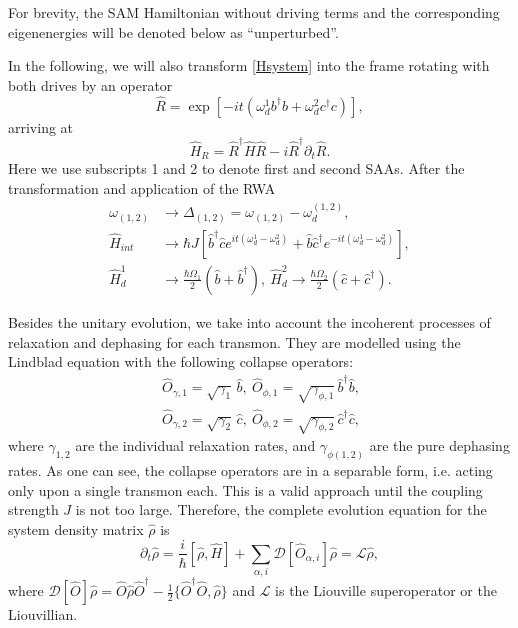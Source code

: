 \documentclass[%
 prx,
 amsmath,amssymb,
 reprint,%
]{revtex4-1}
\begin{document}
For brevity, the SAM Hamiltonian without driving terms and the corresponding eigenenergies will be denoted below as ``unperturbed''.

In the following, we will also transform \autoref{Hsystem} into the frame rotating with both drives by an operator
\begin{equation}
\hat R = \exp[-i t (\omega_d^1 b^{\dagger}b+\omega_d^2 c^{\dagger}c)],\label{eq:R}
\end{equation}
arriving at
\begin{equation}
\hat H_R = \hat R^{\dagger}\hat H \hat R -	 {i}\hat R^{\dagger}\partial_t \hat R.\label{eq:rotation}
\end{equation}
Here we use subscripts 1 and 2 to denote first and second SAAs. After the transformation and application of the RWA
\begin{equation}
\begin{aligned}
	\omega_{(1,2)} &\rightarrow \Delta_{(1,2)} = \omega_{(1,2)} - \omega_d^{(1,2)},\\
	\hat H_{int} &\rightarrow \hbar J \left[\hat b^\dag \hat c e^{it(\omega_d^1 - \omega_d^2)} + \hat b \hat c^\dag e^{-it(\omega_d^1 - \omega_d^2)}\right],\\
	\hat H_{d}^1 &\rightarrow \frac{\hbar \Omega_1}{2}(\hat b  + \hat b^\dag),\ 	\hat H_{d}^2 \rightarrow \frac{\hbar \Omega_2}{2}(\hat c  + \hat c^\dag).
\end{aligned}
\label{eq:RWA}
\end{equation}

Besides the unitary evolution, we take into account the incoherent processes of relaxation and dephasing for each transmon. They are modelled using the Lindblad equation with the following collapse operators\cite{bishop2010circuit}:
\begin{equation}\
\begin{split}
\hat{{O}}_{\gamma, 1} = \sqrt{\gamma_1}\, \hat b,\ 
\hat{{O}}_{\phi, 1} = \sqrt{\gamma_{\phi,1}}\, \hat b^\dag \hat b,\\
\hat{{O}}_{\gamma,2} = \sqrt{\gamma_2}\, \hat c,\ 
\hat{{O}}_{\phi,2} = \sqrt{\gamma_{ \phi,2}}\, \hat c^\dag \hat c,
\end{split}
\end{equation}
where $\gamma_{1,2}$ are the individual relaxation rates, and $\gamma_{\phi (1,2)}$ are the pure dephasing rates. As one can see, the collapse operators are in a separable form, i.e. acting only upon a single transmon each. This is a valid approach until the coupling strength $J$ is not too large\cite{beaudoin2011dissipation}. Therefore, the complete evolution equation for the system density matrix $\hat \rho$ is
\begin{equation}
\partial_t \hat \rho = \frac{i}{\hbar}[\hat \rho, \hat H] + \sum_{\alpha, i} \mathcal{D}[\hat{O}_{\alpha, i}] \hat \rho = \mathcal{L}\hat\rho, \label{eq:master}
\end{equation}
where $\mathcal{D}[\hat{{O}}]\hat \rho = \hat{{O}} \hat \rho \hat{{O}}^\dag - \frac{1}{2}\{ \hat{{O}}^\dag \hat{{O}}, \hat \rho\}$ and $\mathcal{L}$ is the Liouville superoperator or the Liouvillian.
\end{document}
